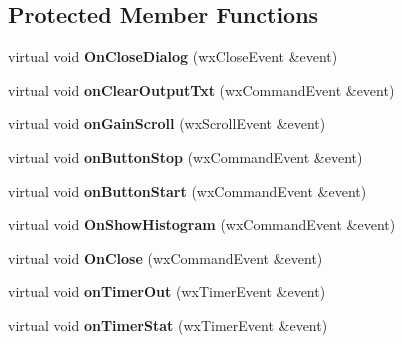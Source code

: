 \subsection*{Protected Member Functions}
\begin{DoxyCompactItemize}
\item 
\mbox{\label{classMainDialogBase_a2d753c85ed39df5a546e7a9d5fa45363}} 
virtual void {\bfseries On\+Close\+Dialog} (wx\+Close\+Event \&event)
\item 
\mbox{\label{classMainDialogBase_a2904b88a4192bfa3d8a214e122849573}} 
virtual void {\bfseries on\+Clear\+Output\+Txt} (wx\+Command\+Event \&event)
\item 
\mbox{\label{classMainDialogBase_a81e778d99d7377020d385182795fca3b}} 
virtual void {\bfseries on\+Gain\+Scroll} (wx\+Scroll\+Event \&event)
\item 
\mbox{\label{classMainDialogBase_a484518dca56c0fca7767652fa01492f6}} 
virtual void {\bfseries on\+Button\+Stop} (wx\+Command\+Event \&event)
\item 
\mbox{\label{classMainDialogBase_af75b2ee75e323e469c28c2d85dcbb9f8}} 
virtual void {\bfseries on\+Button\+Start} (wx\+Command\+Event \&event)
\item 
\mbox{\label{classMainDialogBase_ae70daebee2391514ecbe9d04f0777c8d}} 
virtual void {\bfseries On\+Show\+Histogram} (wx\+Command\+Event \&event)
\item 
\mbox{\label{classMainDialogBase_a7959a4a624c1b9d33a6becacd382364e}} 
virtual void {\bfseries On\+Close} (wx\+Command\+Event \&event)
\item 
\mbox{\label{classMainDialogBase_a9c153c9fe10fa8350d11fb09a0646779}} 
virtual void {\bfseries on\+Timer\+Out} (wx\+Timer\+Event \&event)
\item 
\mbox{\label{classMainDialogBase_a82bbbaffba00c419a848725e4c05e233}} 
virtual void {\bfseries on\+Timer\+Stat} (wx\+Timer\+Event \&event)
\end{DoxyCompactItemize}
